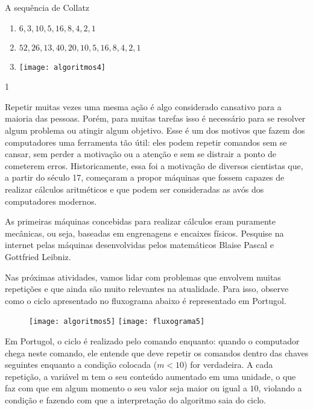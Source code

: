 \begin{answer}{A sequência de Collatz}
{
\begin{enumerate}
\item $6, 3, 10, 5, 16, 8, 4, 2, 1$
\item $52, 26, 13, 40, 20, 10, 5, 16, 8, 4, 2, 1$
\item {}
{
\texttt{[image: algoritmos4]}
}
\end{enumerate}
}{1}
\end{answer}

\label{comp-exp5}

Repetir muitas vezes uma mesma ação é algo considerado cansativo para a maioria das pessoas. Porém, para muitas tarefas isso é necessário para se resolver algum problema ou atingir algum objetivo. Esse é um dos motivos que fazem dos computadores uma ferramenta tão útil: eles podem repetir comandos sem se cansar, sem perder a motivação ou a atenção e sem se distrair a ponto de cometerem erros. Historicamente, essa foi a motivação de diversos cientistas que, a partir do século 17, começaram a propor máquinas que fossem capazes de realizar cálculos aritméticos e que podem ser consideradas as avós dos computadores modernos.

\begin{knowledge}
As primeiras máquinas concebidas para realizar cálculos eram puramente mecânicas, ou seja, baseadas em engrenagens e encaixes físicos. Pesquise na internet pelas máquinas desenvolvidas pelos matemáticos Blaise Pascal e Gottfried Leibniz.
\end{knowledge}

Nas próximas atividades, vamos lidar com problemas que envolvem muitas repetições e que ainda são muito relevantes na atualidade. Para isso, observe como o ciclo apresentado no fluxograma abaixo é representado em Portugol.

\begin{figure}[H]
\centering

\texttt{[image: algoritmos5]}
\hspace{1em}
\texttt{[image: fluxograma5]}
\end{figure}

Em Portugol, o ciclo é realizado pelo comando enquanto: quando o computador chega neste comando, ele entende que deve repetir os comandos dentro das chaves seguintes enquanto a condição colocada ($m<10$) for verdadeira. A cada repetição, a variável m tem o seu conteúdo aumentado em uma unidade, o que faz com que em algum momento o seu valor seja maior ou igual a $10$, violando a condição e fazendo com que a interpretação do algoritmo saia do ciclo.

